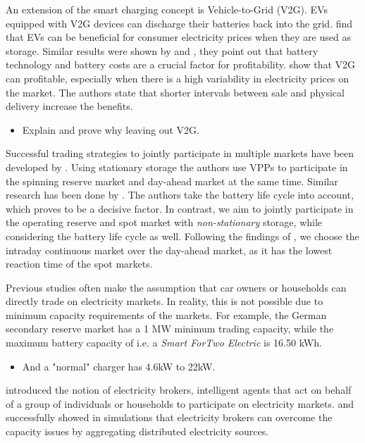 \documentclass[12pt, article]{article}
\begin{document}
An extension of the smart charging concept is Vehicle-to-Grid (V2G). EVs
equipped with V2G devices can discharge their batteries back into the grid.
\textcite{schill11_elect_vehic_imper_elect_market} find that EVs can be beneficial
for consumer electricity prices when they are used as storage. Similar results were shown by
\textcite{reichert10_consid_highl_effic_bidir_batter} and
\textcite{peterson10_econom_using_plug_in_hybrid}, they point out that battery
technology and battery costs are a crucial factor for profitability.
\textcite{tomic07_using_fleet_elect_drive_vehic_grid_suppor} show that V2G can
profitable, especially when there is a high variability in electricity prices on
the market. The authors state that shorter intervals between sale and physical
delivery increase the benefits.

\begin{itemize}
\item Explain and prove why leaving out V2G.
\end{itemize}
Successful trading strategies to jointly participate in multiple markets have
been developed by \textcite{mashhour11_biddin_strat_virtual_power_plant_2}. Using
stationary storage the authors use VPPs to participate in the spinning reserve
market and day-ahead market at the same time. Similar research has been done by
\textcite{he16_optim_biddin_strat_batter_storag}. The authors take the battery
life cycle into account, which proves to be a decisive factor. In contrast, we
aim to jointly participate in the operating reserve and spot market with
\emph{non-stationary} storage, while considering the battery life cycle as well.
Following the findings of
\textcite{tomic07_using_fleet_elect_drive_vehic_grid_suppor}, we choose the
intraday continuous market over the day-ahead market, as it has the lowest
reaction time of the spot markets.


Previous studies often make the assumption that car owners or households can
directly trade on electricity markets. In reality, this is not possible due to
minimum capacity requirements of the markets. For example, the German secondary
reserve market has a 1 MW minimum trading capacity, while the maximum battery
capacity of i.e. a \emph{Smart ForTwo Electric} is 16.50 kWh.
\begin{itemize}
\item And a "normal" charger has 4.6kW to 22kW.
\end{itemize}
\textcite{ketter13_power_tac} introduced the notion of electricity brokers,
intelligent agents that act on behalf of a group of individuals or households to
participate on electricity markets.
\textcite{brandt17_evaluat_busin_model_vehic_grid_integ} and
\textcite{kahlen14_balan_with_elect_vehic} successfully showed in simulations that
electricity brokers can overcome the capacity issues by aggregating distributed
electricity sources.
\end{document}
